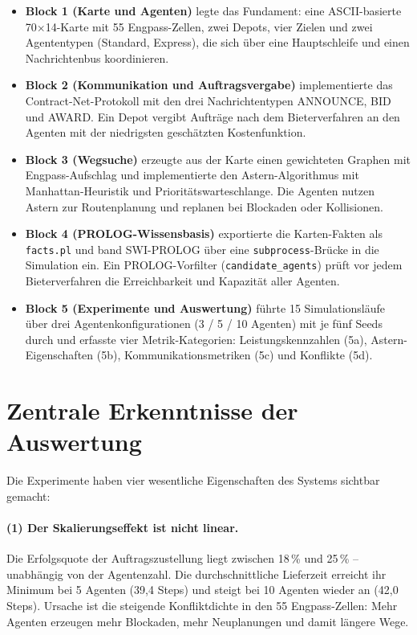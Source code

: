 \begin{itemize}
    \item \textbf{Block 1 (Karte und Agenten)} legte das Fundament: eine \acs{ASCII}-basierte 70$\times$14-Karte mit 55 Engpass-Zellen, zwei Depots, vier Zielen und zwei Agententypen (Standard, Express), die sich über eine Hauptschleife und einen Nachrichtenbus koordinieren.
    \item \textbf{Block 2 (Kommunikation und Auftragsvergabe)} implementierte das Contract-Net-Protokoll mit den drei Nachrichtentypen ANNOUNCE, BID und AWARD. Ein Depot vergibt Aufträge nach dem Bieterverfahren an den Agenten mit der niedrigsten geschätzten Kostenfunktion.
    \item \textbf{Block 3 (Wegsuche)} erzeugte aus der Karte einen gewichteten Graphen mit Engpass-Aufschlag und implementierte den \acs{Astern}-Algorithmus mit Manhattan-Heuristik und Prioritätswarteschlange. Die Agenten nutzen \acs{Astern} zur Routenplanung und replanen bei Blockaden oder Kollisionen.
    \item \textbf{Block 4 (\acs{PROLOG}-Wissensbasis)} exportierte die Karten-Fakten als \texttt{facts.pl} und band \acs{SWI}-\acs{PROLOG} über eine \texttt{subprocess}-Brücke in die Simulation ein. Ein \acs{PROLOG}-Vorfilter (\texttt{candidate\_agents}) prüft vor jedem Bieterverfahren die Erreichbarkeit und Kapazität aller Agenten.
    \item \textbf{Block 5 (Experimente und Auswertung)} führte 15 Simulationsläufe über drei Agentenkonfigurationen (3 / 5 / 10 Agenten) mit je fünf Seeds durch und erfasste vier Metrik-Kategorien: Leistungskennzahlen (5a), \acs{Astern}-Eigenschaften (5b), Kommunikationsmetriken (5c) und Konflikte (5d).
\end{itemize}

\section{Zentrale Erkenntnisse der Auswertung}

Die Experimente haben vier wesentliche Eigenschaften des Systems sichtbar gemacht:

\paragraph{(1) Der Skalierungseffekt ist nicht linear.}
Die Erfolgsquote der Auftragszustellung liegt zwischen 18\,\% und 25\,\% -- unabhängig von der Agentenzahl. Die durchschnittliche Lieferzeit erreicht ihr Minimum bei 5 Agenten (39{,}4 Steps) und steigt bei 10 Agenten wieder an (42{,}0 Steps). Ursache ist die steigende Konfliktdichte in den 55 Engpass-Zellen: Mehr Agenten erzeugen mehr Blockaden, mehr Neuplanungen und damit längere Wege.


